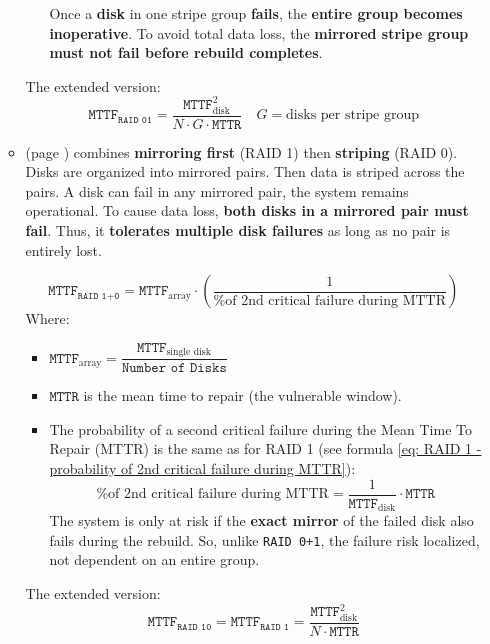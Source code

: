 \begin{itemize}
\begin{itemize}
\begin{itemize}
            Once a \textbf{disk} in one stripe group \textbf{fails}, the \textbf{entire group becomes inoperative}. To avoid total data loss, the \textbf{mirrored stripe group must not fail before rebuild completes}. 
        \end{itemize}
        The extended version:
        \begin{equation}\label{eq: RAID 01 - MTTF}
            \texttt{MTTF}_{\texttt{RAID 01}} = \dfrac{\texttt{MTTF}_{\text{disk}}^{2}}{N \cdot G \cdot \texttt{MTTR}} \quad G = \text{disks per stripe group}
        \end{equation}

        
        \item {} (page ) combines \textbf{mirroring first} (RAID 1) then \textbf{striping} (RAID 0). Disks are organized into mirrored pairs. Then data is striped across the pairs. A disk can fail in any mirrored pair, the system remains operational. To cause data loss, \textbf{both disks in a mirrored pair must fail}. Thus, it \textbf{tolerates multiple disk failures} as long as no pair is entirely lost.
        
        \begin{equation}
            \texttt{MTTF}_{\texttt{RAID 1+0}} = \texttt{MTTF}_{\text{array}} \cdot \left(
                \dfrac{1}{\text{\% of 2nd critical failure during MTTR}}
            \right)
        \end{equation}
        Where:
        \begin{itemize}
            \item $\texttt{MTTF}_{\text{array}} = \dfrac{\texttt{MTTF}_{\text{single disk}}}{\texttt{Number of Disks}}$
            \item $\texttt{MTTR}$ is the mean time to repair (the vulnerable window).
            \item The probability of a second critical failure during the Mean Time To Repair (MTTR) is the same as for RAID 1 (see formula \ref{eq: RAID 1 - probability of 2nd critical failure during MTTR}):
            \begin{equation}
                \text{\% of 2nd critical failure during MTTR} = \dfrac{1}{\texttt{MTTF}_{\text{disk}}} \cdot \texttt{MTTR}
            \end{equation}
            The system is only at risk if the \textbf{exact mirror} of the failed disk also fails during the rebuild. So, unlike \texttt{RAID 0+1}, the failure risk localized, not dependent on an entire group.
        \end{itemize}
        The extended version:
        \begin{equation}\label{eq: RAID 10 - MTTF}
            \texttt{MTTF}_{\texttt{RAID 10}} = \texttt{MTTF}_{\texttt{RAID 1}} = \dfrac{\texttt{MTTF}_{\text{disk}}^{2}}{N \cdot \texttt{MTTR}}
        \end{equation}



\end{itemize}
\end{itemize}
